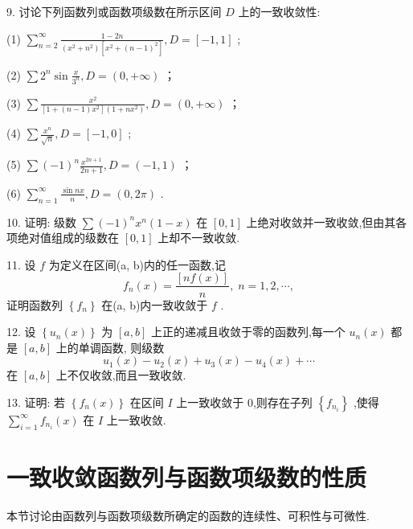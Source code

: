 9. 讨论下列函数列或函数项级数在所示区间 \(D\) 上的一致收敛性:

(1) \(\mathop{\sum }\limits_{{n = 2}}^{\infty }\frac{1 - {2n}}{\left( {{x}^{2} + {n}^{2}}\right) \left\lbrack  {{x}^{2} + {\left( n - 1\right) }^{2}}\right\rbrack  },D = \left\lbrack  {-1,1}\right\rbrack\) ;

(2) \(\sum {2}^{n}\sin \frac{x}{{3}^{n}},D = \left( {0, + \infty }\right)\) ；

(3) \(\sum \frac{{x}^{2}}{\left\lbrack  {1 + \left( {n - 1}\right) {x}^{2}}\right\rbrack  \left( {1 + n{x}^{2}}\right) },D = \left( {0, + \infty }\right)\) ；

(4) \(\sum \frac{{x}^{n}}{\sqrt{n}},D = \left\lbrack  {-1,0}\right\rbrack\) ;

(5) \(\sum {\left( -1\right) }^{n}\frac{{x}^{{2n} + 1}}{{2n} + 1},D = \left( {-1,1}\right)\) ；

(6) \(\mathop{\sum }\limits_{{n = 1}}^{\infty }\frac{\sin {nx}}{n},D = \left( {0,{2\pi }}\right)\) .

10. 证明: 级数 \(\sum {\left( -1\right) }^{n}{x}^{n}\left( {1 - x}\right)\) 在 \(\left\lbrack  {0,1}\right\rbrack\) 上绝对收敛并一致收敛,但由其各项绝对值组成的级数在 \(\left\lbrack  {0,1}\right\rbrack\) 上却不一致收敛.

11. 设 \(f\) 为定义在区间(a, b)内的任一函数,记
\[
{f}_{n}\left( x\right)  = \frac{\left\lbrack  nf\left( x\right) \right\rbrack  }{n},\;n = 1,2,\cdots ,
\]
证明函数列 \(\left\{  {f}_{n}\right\}\) 在(a, b)内一致收敛于 \(f\) .

12. 设 \(\left\{  {{u}_{n}\left( x\right) }\right\}\) 为 \(\left\lbrack  {a,b}\right\rbrack\) 上正的递减且收敛于零的函数列,每一个 \({u}_{n}\left( x\right)\) 都是 \(\left\lbrack  {a,b}\right\rbrack\) 上的单调函数, 则级数
\[
{u}_{1}\left( x\right)  - {u}_{2}\left( x\right)  + {u}_{3}\left( x\right)  - {u}_{4}\left( x\right)  + \cdots
\]
在 \(\left\lbrack  {a,b}\right\rbrack\) 上不仅收敛,而且一致收敛.

13. 证明: 若 \(\left\{  {{f}_{n}\left( x\right) }\right\}\) 在区间 \(I\) 上一致收敛于 0,则存在子列 \(\left\{  {f}_{{n}_{i}}\right\}\) ,使得 \(\mathop{\sum }\limits_{{i = 1}}^{\infty }{f}_{{n}_{i}}\left( x\right)\) 在 \(I\) 上一致收敛.

\section{一致收敛函数列与函数项级数的性质}

本节讨论由函数列与函数项级数所确定的函数的连续性、可积性与可微性.

